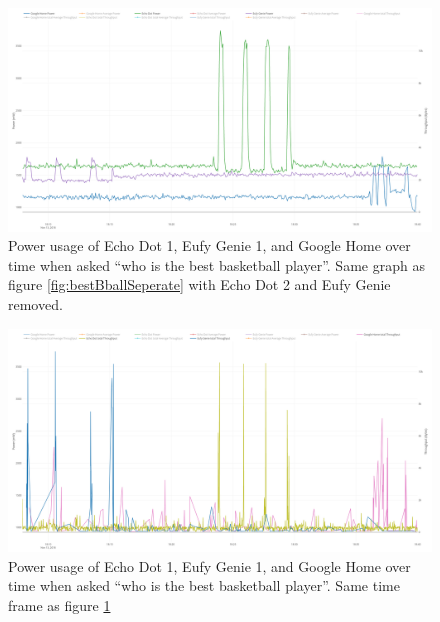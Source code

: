 \begin{figure}[H]
  \centering
  \includegraphics[width=1\textwidth]{figures/smartSpeakerSeperate.png}
  \caption{Power usage of Echo Dot 1, Eufy Genie 1, and Google Home over time when asked ``who is the best basketball player''. Same graph as figure \ref{fig:bestBballSeperate} with Echo Dot 2 and Eufy Genie removed.}
  \label{fig:smartSpeakerSeperate}
\end{figure}

\begin{figure}[H]
  \centering
  \includegraphics[width=1\textwidth]{figures/smartSpeakerNetworkSeperate.png}
  \caption{Power usage of Echo Dot 1, Eufy Genie 1, and Google Home over time when asked ``who is the best basketball player''. Same time frame as figure \ref{fig:smartSpeakerSeperate}}
  \label{fig:smartSpeakerNetworkSeperate}
\end{figure}

